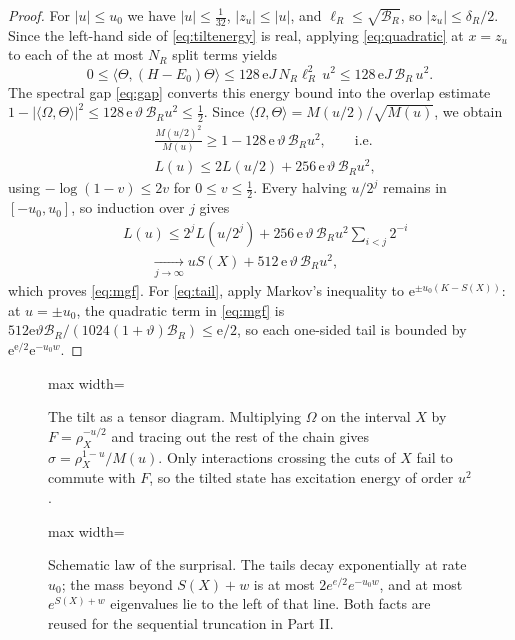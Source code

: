 \documentclass[aps,prx,reprint,superscriptaddress,floatfix,nofootinbib,longbibliography,amsmath,amssymb]{revtex4-2}
\newcommand{\abs}[1]{\lvert #1\rvert}
\newcommand{\cB}{\mathcal B}
\newcommand{\Om}{\Omega}
\newcommand{\e}{\mathrm e}
\theoremstyle{plain}
\theoremstyle{definition}
\begin{document}
\begin{proof}
For $\abs u\le u_0$ we have $\abs u\le\frac1{32}$, $\abs{z_u}\le\abs u$, and
$\ell_R\le\sqrt{\cB_R}$, so $\abs{z_u}\le\delta_R/2$. Since the left-hand
side of \eqref{eq:tiltenergy} is real, applying \eqref{eq:quadratic} at
$x=z_u$ to each of the at most $N_R$ split terms yields
\begin{equation}\label{eq:energyquad}
 0\le\langle\Theta,(H-E_0)\Theta\rangle\le 128\,\e J\,N_R\ell_R^2\,u^2
 \le 128\,\e J\,\cB_R\,u^2 .
\end{equation}
The spectral gap \eqref{eq:gap} converts this energy bound into the
overlap estimate
$1-\abs{\langle\Om,\Theta\rangle}^2\le 128\,\e\,\vartheta\,\cB_Ru^2\le\frac12$.
Since $\langle\Om,\Theta\rangle=M(u/2)/\sqrt{M(u)}$, we obtain
\[
\begin{split}
 &\frac{M(u/2)^2}{M(u)}\ge 1-128\,\e\,\vartheta\,\cB_R u^2,
 \qquad\text{i.e.}\\
 &L(u)\le 2L(u/2)+256\,\e\,\vartheta\,\cB_Ru^2,
\end{split}
\]
using $-\log(1-v)\le2v$ for $0\le v\le\frac12$. Every halving $u/2^j$
remains in $[-u_0,u_0]$, so induction over $j$ gives
\[
\begin{split}
 &L(u)\le 2^jL(u/2^j)+256\,\e\,\vartheta\,\cB_Ru^2\sum_{i<j}2^{-i}\\
 &\qquad\xrightarrow[j\to\infty]{} uS(X)+512\,\e\,\vartheta\,\cB_Ru^2 ,
\end{split}
\]
which proves \eqref{eq:mgf}. For \eqref{eq:tail}, apply Markov's inequality
to $\e^{\pm u_0(K-S(X))}$: at $u=\pm u_0$, the quadratic term in
\eqref{eq:mgf} is $512\e\vartheta\cB_R/(1024(1+\vartheta)\cB_R)\le\e/2$, so
each one-sided tail is bounded by $\e^{\e/2}\e^{-u_0w}$.
\end{proof}

\begin{figure}[t]
\centering
\begin{adjustbox}{max width=\linewidth}

\end{adjustbox}
\caption{The tilt as a tensor diagram. Multiplying $\Omega$ on the interval $X$ by $F=\rho_X^{-u/2}$ and tracing out the rest of the chain gives $\sigma=\rho_X^{1-u}/M(u)$. Only interactions crossing the cuts of $X$ fail to commute with $F$, so the tilted state has excitation energy of order $u^2$.}\label{fig:tilt}
\end{figure}

\begin{figure}[t]
\centering
\begin{adjustbox}{max width=\linewidth}

\end{adjustbox}
\caption{Schematic law of the surprisal. The tails decay exponentially at rate $u_0$; the mass beyond $S(X)+w$ is at most $2e^{e/2}e^{-u_0w}$, and at most $e^{S(X)+w}$ eigenvalues lie to the left of that line. Both facts are reused for the sequential truncation in Part II.}\label{fig:tail-sketch}
\end{figure}
\end{document}
